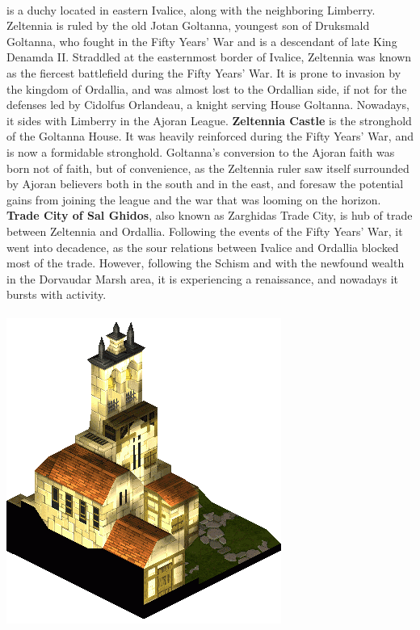 \pagebreak\\
%
 is a duchy located in eastern Ivalice, along with the neighboring Limberry.
Zeltennia is ruled by the old Jotan Goltanna, youngest son of Druksmald Goltanna, who fought in the Fifty Years' War and is a descendant of late King Denamda II. 
Straddled at the easternmost border of Ivalice, Zeltennia was known as the fiercest battlefield during the Fifty Years' War. 
It is prone to invasion by the kingdom of Ordallia, and was almost lost to the Ordallian side, if not for the defenses led by Cidolfus Orlandeau, a knight serving House Goltanna.
Nowadays, it sides with Limberry in the Ajoran League.
\textbf{Zeltennia Castle} is the stronghold of the Goltanna House.
It was heavily reinforced during the Fifty Years' War, and is now a formidable stronghold.
Goltanna's conversion to the Ajoran faith was born not of faith, but of convenience, as the Zeltennia ruler saw itself surrounded by Ajoran believers both in the south and in the east, and foresaw the potential gains from joining the league and the war that was looming on the horizon.
\textbf{Trade City of Sal Ghidos}, also known as Zarghidas Trade City, is hub of trade between Zeltennia and Ordallia. 
Following the events of the Fifty Years' War, it went into decadence, as the sour relations between Ivalice and Ordallia blocked most of the trade. 
However, following the Schism and with the newfound wealth in the Dorvaudar Marsh area, it is experiencing a renaissance, and nowadays it bursts with activity.
%
\\\\
\includegraphics[width=\columnwidth]{./art/images/zeltenniachapel.png}

